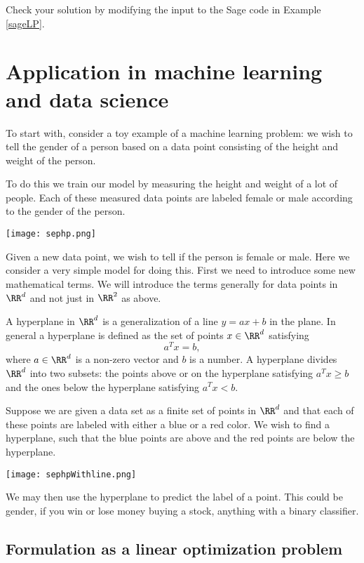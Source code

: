 \documentclass{article}
\begin{document}
Check your solution by modifying the input to the Sage code in Example \ref{sageLP}. 

\endshex

  
\section{Application in machine learning and data science}\label{sec:mlds}


To start with, consider a toy example of a machine learning problem: we wish
to tell the gender of a person based on a data point consisting of
the height and weight of the person.

To do this we train our model by measuring the height and weight of a
lot of people. Each of these measured data points are labeled
female or male according to the gender of the person.

\texttt{[image: sephp.png]}

Given a new data point, we wish to tell if the person is female or male. Here we
consider a very simple model for doing this. First we need to introduce some
new mathematical terms. We will introduce the terms generally for
data points in $\RR^d$ and not just in $\RR^2$ as above.


A hyperplane in $\RR^d$ is a generalization of a line $y = a x + b$ in the plane. In general
a hyperplane is defined as the set of points $x\in \RR^d$ satisfying
$$
a^T x = b,
$$
where $a\in \RR^d$ is a non-zero vector and $b$ is a number. A hyperplane divides $\RR^d$
into two subsets: the points above or on the hyperplane satisfying $a^T x \geq b$ and the ones
below the hyperplane satisfying $a^T x < b$.


Suppose we are given a data set as a finite set of points in $\RR^d$ and that each of
these points are labeled with either a blue or a red color. We wish to
find a hyperplane, such that the blue points are above and the red points
are below the hyperplane.

\texttt{[image: sephpWithline.png]}


We may then use the hyperplane to predict the label of a point. This could be
gender, if you win or lose money buying a stock, anything with
a binary classifier.



  
  \subsection{Formulation as a linear optimization problem}
\end{document}
